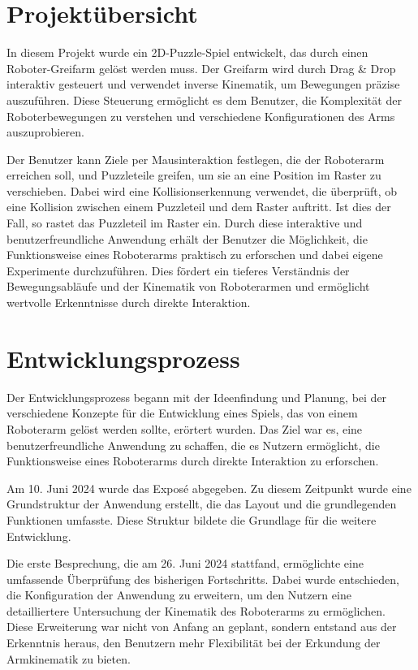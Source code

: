 \documentclass[12pt]{article}
\begin{document}
    \section{Projektübersicht}
        In diesem Projekt wurde ein 2D-Puzzle-Spiel entwickelt, das durch einen Roboter-Greifarm gelöst werden
        muss. Der Greifarm wird durch Drag & Drop interaktiv gesteuert und verwendet inverse Kinematik, um
        Bewegungen präzise auszuführen. Diese Steuerung ermöglicht es dem Benutzer, die Komplexität der
        Roboterbewegungen zu verstehen und verschiedene Konfigurationen des Arms auszuprobieren.

        Der Benutzer kann Ziele per Mausinteraktion festlegen, die der Roboterarm erreichen soll, und Puzzleteile
        greifen, um sie an eine Position im Raster zu verschieben. Dabei wird eine Kollisionserkennung verwendet,
        die überprüft, ob eine Kollision zwischen einem Puzzleteil und dem Raster auftritt. Ist dies der Fall, so
        rastet das Puzzleteil im Raster ein. Durch diese interaktive und benutzerfreundliche Anwendung erhält der
        Benutzer die Möglichkeit, die Funktionsweise eines Roboterarms praktisch zu erforschen und dabei eigene
        Experimente durchzuführen. Dies fördert ein tieferes Verständnis der Bewegungsabläufe und der Kinematik
        von Roboterarmen und ermöglicht wertvolle Erkenntnisse durch direkte Interaktion.

    \section{Entwicklungsprozess}
        Der Entwicklungsprozess begann mit der Ideenfindung und Planung, bei der verschiedene Konzepte für die
        Entwicklung eines Spiels, das von einem Roboterarm gelöst werden sollte, erörtert wurden. Das Ziel war es,
        eine benutzerfreundliche Anwendung zu schaffen, die es Nutzern ermöglicht, die Funktionsweise eines
        Roboterarms durch direkte Interaktion zu erforschen.

        Am 10. Juni 2024 wurde das Exposé abgegeben. Zu diesem Zeitpunkt wurde eine Grundstruktur der Anwendung
        erstellt, die das Layout und die grundlegenden Funktionen umfasste. Diese Struktur bildete die Grundlage
        für die weitere Entwicklung.

        Die erste Besprechung, die am 26. Juni 2024 stattfand, ermöglichte eine umfassende Überprüfung des
        bisherigen Fortschritts. Dabei wurde entschieden, die Konfiguration der Anwendung zu erweitern, um den
        Nutzern eine detailliertere Untersuchung der Kinematik des Roboterarms zu ermöglichen. Diese Erweiterung
        war nicht von Anfang an geplant, sondern entstand aus der Erkenntnis heraus, den Benutzern mehr
        Flexibilität bei der Erkundung der Armkinematik zu bieten.
\end{document}
